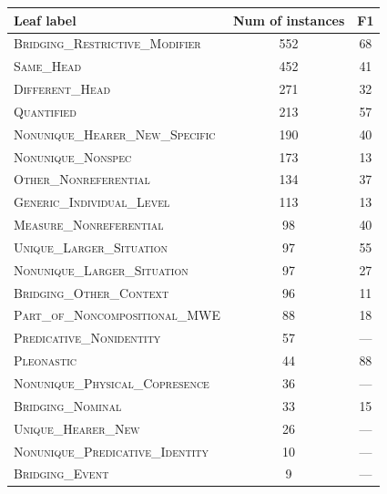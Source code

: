 \documentclass[landscape,final]{baposter}
\begin{document}
\begin{poster}
{\begin{center}\small
\smaller [.5]
\begin{tabular}{|l|c|c|}
 \multicolumn{1}{p{9em}}{\bf \normalsize{Leaf label}} & \multicolumn{1}{c}{\bf \normalsize{Num of instances}} & \multicolumn{1}{c}{\bf \normalsize{F1}}	\\				
       \hline %
\textsc{Bridging\_Restrictive\_Modifier} & 552 & 68 \\
\textsc{Same\_Head} & 452 & 41 \\
\textsc{Different\_Head} & 271 & 32 \\
\textsc{Quantified} & 213 & 57 \\
\textsc{Nonunique\_Hearer\_New\_Specific} & 190 & 40 \\
\textsc{Nonunique\_Nonspec} & 173 & 13 \\
\textsc{Other\_Nonreferential} & 134 & 37 \\
\textsc{Generic\_Individual\_Level} & 113 & 13 \\
\textsc{Measure\_Nonreferential} & 98 & 40 \\
\textsc{Unique\_Larger\_Situation} & 97 & 55 \\
\textsc{Nonunique\_Larger\_Situation} & 97 & 27 \\
\textsc{Bridging\_Other\_Context} & 96 & 11 \\
\textsc{Part\_of\_Noncompositional\_MWE} & 88 & 18 \\
\textsc{Predicative\_Nonidentity} & 57 & --- \\
\textsc{Pleonastic} & 44 & 88 \\
\textsc{Nonunique\_Physical\_Copresence} & 36 & --- \\
\textsc{Bridging\_Nominal} & 33 & 15 \\
\textsc{Unique\_Hearer\_New} & 26 & --- \\
\textsc{Nonunique\_Predicative\_Identity} & 10 & --- \\
\textsc{Bridging\_Event} & 9 & --- \\
			\hline%
\end{tabular}
\end{center}
}
\end{poster}
\end{document}
